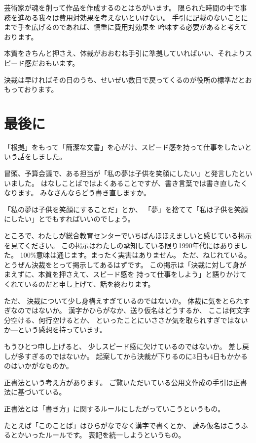 \documentclass[uplatex,jis2004,dvipdfmx,12pt]{jsarticle}
\begin{document}
芸術家が魂を削って作品を作成するのとはちがいます。
限られた時間の中で事務を進める我々は費用対効果を考えないといけない。
手引に記載のないことにまで手を広げるのであれば、慎重に費用対効果を
吟味する必要があると考えております。


本質をきちんと押さえ、体裁がおおむね手引に準拠していればいい、それよりス
ピード感だおもいます。

決裁は早ければその日のうち、せいぜい数日で戻ってくるのが役所の標準だとお
もっております。

\section{最後に}
「根拠」をもって「簡潔な文書」を心がけ、スピード感を持って仕事をしたいという話をしました。



冒頭、予算会議で、ある担当が「私の夢は子供を笑顔にしたい」と発言したとい
いました。
はなしことばではよくあることですが、書き言葉では書き直したくなります。
みなさんならどう書き直しますか。

「私の夢は子供を笑顔にすることだ」とか、
「夢」を捨てて「私は子供を笑顔にしたい」とでもすればいいのでしょう。

ところで、わたしが総合教育センターでいちばんほほえましいと感じている掲示を見てください。
この掲示はわたしの承知している限り1990年代にはありました。
100\%意味は通じます。まったく実害はありません。
ただ、ねじれている。
とうぜん決裁をとって掲示してあるはずです。
この掲示は「決裁に対して身がまえずに、本質を押さえて、スピード感を
持って仕事をしよう」と語りかけてくれているのだと申し上げて、話を終わります。




ただ、
決裁について少し身構えすぎているのではないか。
体裁に気をとられすぎなのではないか。
漢字かひらがなか、送り仮名はどうするか、
ここは何文字分空ける、何行空けるとか、
といったことにいささか気を取られすぎではないか---という感想を持っています。


もうひとつ申し上げると、
少しスピード感に欠けているのではないか。
差し戻しが多すぎるのではないか。
起案してから決裁が下りるのに3日も4日もかかるのはいかがなものか。


正書法という考え方があります。
ご覧いただいている公用文作成の手引は正書法に基づいている。

正書法とは「書き方」に関するルールにしたがっていこうというもの。

たとえば「このことば」はひらがなでなく漢字で書くとか、
読み仮名はこうふるとかいったルールです。
表記を統一しようというもの。
\end{document}
